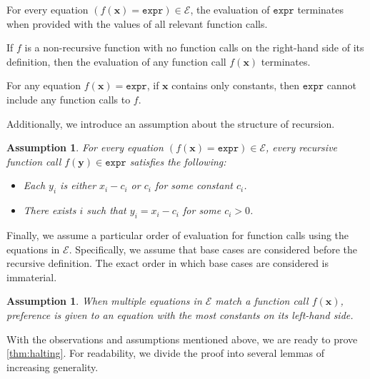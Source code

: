 \documentclass[a4paper,UKenglish,cleveref, autoref, thm-restate]{lipics-v2021}
\newcommand{\expr}{\mathtt{expr}}
\newtheorem{assumption}[theorem]{Assumption}
\begin{document}
\begin{observation}\label{assumption3}
  For every equation $(f(\mathbf{x}) = \expr) \in \mathcal{E}$, the evaluation
  of $\expr$ terminates when provided with the values of all relevant function
  calls.
\end{observation}

\begin{corollary}\label{fact}
  If $f$ is a non-recursive function with no function calls on the right-hand
  side of its definition, then the evaluation of any function call
  $f(\mathbf{x})$ terminates.
\end{corollary}

\begin{observation}\label{fact2}
  For any equation $f(\mathbf{x}) = \expr{}$, if $\mathbf{x}$ contains only
  constants, then $\expr{}$ cannot include any function calls to $f$.
\end{observation}

Additionally, we introduce an assumption about the structure of recursion.

\begin{assumption}\label{assumption4}
  For every equation $(f(\mathbf{x}) = \expr) \in \mathcal{E}$, every recursive
  function call $f(\mathbf{y}) \in \expr$ satisfies the
  following:
  \begin{itemize}
    \item Each $y_{i}$ is either $x_{i} - c_{i}$ or $c_{i}$ for some constant
          $c_{i}$.
    \item There exists $i$ such that $y_{i} = x_{i} - c_{i}$ for some
          $c_{i} > 0$.
  \end{itemize}
\end{assumption}

Finally, we assume a particular order of evaluation for function calls using the
equations in $\mathcal{E}$. Specifically, we assume that base cases are
considered before the recursive definition. The exact order in which base cases
are considered is immaterial.

\begin{assumption}
  When multiple equations in $\mathcal{E}$ match a function call
  $f(\mathbf{x})$, preference is given to an equation with the most constants on
  its left-hand side.
\end{assumption}

With the observations and assumptions mentioned above, we are ready to prove
\cref{thm:halting}. For readability, we divide the proof into several lemmas of
increasing generality.
\end{document}
